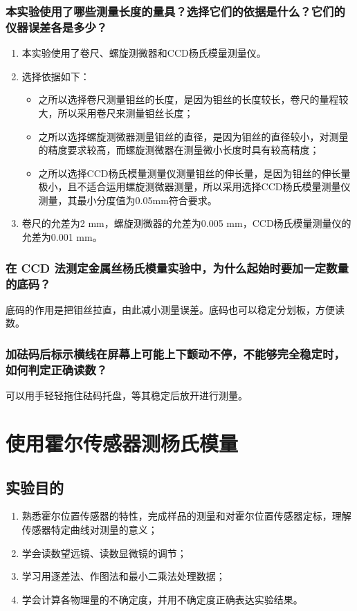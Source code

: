 \documentclass[zihao=5, UTF8]{article}
\theoremstyle{MyLineTheoremStyle} %
\theoremstyle{MyBlockTheoremStyle} %
\theoremstyle{MySubsubsectionStyle} %
\begin{document}
\subsubsection{本实验使用了哪些测量长度的量具？选择它们的依据是什么？它们的仪器误差各是多少？}
\begin{enumerate}
    \item 本实验使用了卷尺、螺旋测微器和CCD杨氏模量测量仪。
    \item 选择依据如下：
    \begin{itemize}
        \item 之所以选择卷尺测量钼丝的长度，是因为钼丝的长度较长，卷尺的量程较大，所以采用卷尺来测量钼丝长度；
        \item 之所以选择螺旋测微器测量钼丝的直径，是因为钼丝的直径较小，对测量的精度要求较高，而螺旋测微器在测量微小长度时具有较高精度；
        \item 之所以选择CCD杨氏模量测量仪测量钼丝的伸长量，是因为钼丝的伸长量极小，且不适合运用螺旋测微器测量，所以采用选择CCD杨氏模量测量仪测量，其最小分度值为0.05mm符合要求。
    \end{itemize}

    \item 卷尺的允差为2 mm，螺旋测微器的允差为0.005 mm，CCD杨氏模量测量仪的允差为0.001 mm。
\end{enumerate}

\subsubsection{在 CCD 法测定金属丝杨氏模量实验中，为什么起始时要加一定数量的底码？}
底码的作用是把钼丝拉直，由此减小测量误差。底码也可以稳定分划板，方便读数。

\subsubsection{加砝码后标示横线在屏幕上可能上下颤动不停，不能够完全稳定时，如何判定正确读数？}
可以用手轻轻拖住砝码托盘，等其稳定后放开进行测量。
\section{使用霍尔传感器测杨氏模量}
\subsection{实验目的}
\begin{enumerate}
    \item 熟悉霍尔位置传感器的特性，完成样品的测量和对霍尔位置传感器定标，理解传感器特定曲线对测量的意义；
    \item 学会读数望远镜、读数显微镜的调节；
    \item 学习用逐差法、作图法和最小二乘法处理数据；
    \item 学会计算各物理量的不确定度，并用不确定度正确表达实验结果。
\end{enumerate}
\end{document}
